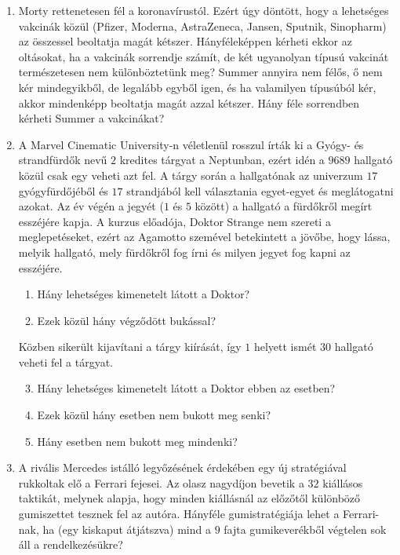 \documentclass[a4paper,12pt]{article}
\begin{document}
    \noindent{}
    \noindent{}
    \begin{enumerate}
        \item Morty rettenetesen fél a koronavírustól. Ezért úgy döntött, hogy a lehetséges vakcinák közül (Pfizer, Moderna, AstraZeneca, Jansen, Sputnik, Sinopharm) az összessel beoltatja magát kétszer. Hányféleképpen kérheti ekkor az oltásokat, ha a vakcinák sorrendje számít, de két ugyanolyan típusú vakcinát természetesen nem különböztetünk meg? Summer annyira nem félős, ő nem kér mindegyikből, de legalább egyből igen, és ha valamilyen típusúból kér, akkor mindenképp beoltatja magát azzal kétszer. Hány féle sorrendben kérheti Summer a vakcinákat?
        
        \item A Marvel Cinematic University-n véletlenül rosszul írták ki a Gyógy- és strandfürdők nevű $2$ kredites tárgyat a Neptunban, ezért idén a $9689$ hallgató közül csak egy veheti azt fel. A tárgy során a hallgatónak az univerzum $17$ gyógyfürdőjéből és $17$ strandjából kell választania egyet-egyet és meglátogatni azokat. Az év végén a jegyét ($1$ és $5$ között) a hallgató a fürdőkről megírt esszéjére kapja. A kurzus előadója, Doktor Strange nem szereti a meglepetéseket, ezért az Agamotto szemével betekintett a jövőbe, hogy lássa, melyik hallgató, mely fürdőkről fog írni és milyen jegyet fog kapni az esszéjére.
        \begin{enumerate}
            \item Hány lehetséges kimenetelt látott a Doktor?
            \item Ezek közül hány végződött bukással?
        \end{enumerate}
        Közben sikerült kijavítani a tárgy kiírását, így $1$ helyett ismét $30$ hallgató veheti fel a tárgyat.
        \begin{enumerate}
            \setcounter{enumii}{2}
            \item Hány lehetséges kimenetelt látott a Doktor ebben az esetben?
            \item Ezek közül hány esetben nem bukott meg senki?
            \item Hány esetben nem bukott meg mindenki?
        \end{enumerate}

        \item A rivális Mercedes istálló legyőzésének érdekében egy új stratégiával rukkoltak elő a Ferrari fejesei. Az olasz nagydíjon bevetik a $32$ kiállásos taktikát, melynek alapja, hogy minden kiállásnál az előzőtől különböző gumiszettet tesznek fel az autóra. Hányféle gumistratégiája lehet a Ferrari-nak, ha (egy kiskaput átjátszva) mind a $9$ fajta gumikeverékből végtelen sok áll a rendelkezésükre?
        

\end{enumerate}
\end{document}
